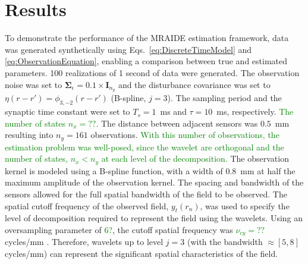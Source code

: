 \documentclass[journal,a4paper]{IEEEtran}
\newcommand{\dean}[1]{\textcolor{green}{#1}}
\newcommand{\cut}[1]{\textcolor{cyan}{#1}}
\begin{document}
\section{Results}
To demonstrate the performance of the MRAIDE estimation framework, data was generated synthetically  using Eqs.~\ref{eq:DiscreteTimeModel} and \ref{eq:ObservationEquation}, enabling a comparison between true and estimated parameters. 100 realizations of 1 second of data were generated. The observation noise was set to $\boldsymbol\Sigma_{\epsilon}=0.1 \times \mathbf{I}_{n_y}$ and the disturbance covariance was set to $\eta(r-r') = \phi_{3,-2}(r-r')$ (B-spline, $j=3$). The sampling period and the synaptic time constant were set to $T_s = 1$~ms and $\tau = 10$~ms, respectively. \dean{The number of states $n_x = ??$.} The distance between adjacent sensors was $0.5$~mm resulting into $n_y = 161$ observations. \dean{With this number of observations, the estimation problem was well-posed, since the wavelet are orthogonal and the number of states, $n_x < n_y$ at each level of the decomposition.} The observation kernel is modeled using a B-spline function, with a width of 0.8~mm at half the maximum amplitude of the observation kernel. The spacing and bandwidth of the sensors allowed for the full spatial bandwidth of the field to be observed. The spatial cutoff frequency of the observed field, $y_t(r_n)$, was used to specify the level of decomposition required to represent the field using the wavelets. Using an oversampling parameter of \dean{6?}, the cutoff spatial frequency was \dean{$\nu_{cy} = ??$} cycles/mm \cite{freestone2011}. Therefore, wavelets up to level $j=3$ (with the bandwidth $\approx[5,8]$ cycles/mm) can represent the significant spatial characteristics of the field. 
\end{document}

